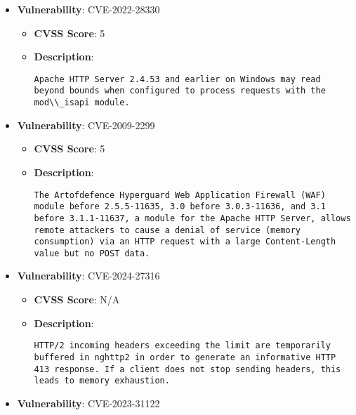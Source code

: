 \documentclass{article}
\begin{document}
\begin{itemize}
        \item \textbf{Vulnerability}: CVE-2022-28330
        \begin{itemize}
            \item \textbf{CVSS Score}:  5 
            \item \textbf{Description}:
            \parbox[t]{0.9\linewidth}{
                \verb|Apache HTTP Server 2.4.53 and earlier on Windows may read beyond bounds when configured to process requests with the mod\\_isapi module.|
            }
        \end{itemize}
    
        \item \textbf{Vulnerability}: CVE-2009-2299
        \begin{itemize}
            \item \textbf{CVSS Score}:  5 
            \item \textbf{Description}:
            \parbox[t]{0.9\linewidth}{
                \verb|The Artofdefence Hyperguard Web Application Firewall (WAF) module before 2.5.5-11635, 3.0 before 3.0.3-11636, and 3.1 before 3.1.1-11637, a module for the Apache HTTP Server, allows remote attackers to cause a denial of service (memory consumption) via an HTTP request with a large Content-Length value but no POST data.|
            }
        \end{itemize}
    
        \item \textbf{Vulnerability}: CVE-2024-27316
        \begin{itemize}
            \item \textbf{CVSS Score}:  N/A 
            \item \textbf{Description}:
            \parbox[t]{0.9\linewidth}{
                \verb|HTTP/2 incoming headers exceeding the limit are temporarily buffered in nghttp2 in order to generate an informative HTTP 413 response. If a client does not stop sending headers, this leads to memory exhaustion.|
            }
        \end{itemize}
    
        \item \textbf{Vulnerability}: CVE-2023-31122
\end{itemize}
\end{document}
